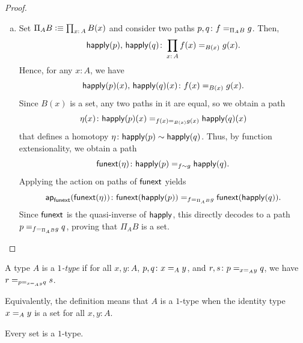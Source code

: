\begin{proof}
\begin{enumerate}[a),font=\upshape]
        \item Set $\Pi_AB\defeq\prod_{x\colon A}B(x)$ and consider two paths $p,q\colon f\eq{\Pi_AB}g$. Then,
        \[
            \fun{happly}(p),\,\fun{happly}(q)
                \colon\prod_{x\colon A}f(x)\eq{B(x)}g(x).
        \]
        Hence, for any $x\colon A$, we have
        \[
            \fun{happly}(p)(x),\,\fun{happly}(q)(x)\colon f(x)\eq{B(x)}g(x).
        \]
        Since $B(x)$ is a set, any two paths in it are equal, so we obtain a path
        \[
            \eta(x)\colon\fun{happly}(p)(x)
                \eq{f(x)\eq{B(x)}g(x)}\fun{happly}(q)(x)
        \]
        that defines a homotopy $\eta\colon\fun{happly}(p)\sim\fun{happly}(q)$. Thus, by function extensionality, we obtain a path
        \[
            \fun{funext}(\eta)\colon\fun{happly}(p)\eq{f\sim g}\fun{happly}(q).
        \]
        Applying the action on paths of $\mathsf{funext}$ yields
        \[
            \fun{ap}_{\fun{funext}}(\fun{funext}(\eta))\colon
                \fun{funext}(\fun{happly}(p))
                \eq{f\eq{\Pi_AB}g}
                \fun{funext}(\fun{happly}(q)).
        \]
        Since $\mathsf{funext}$ is the quasi-inverse of $\mathsf{happly}$, this directly decodes to a path $p\mathrel{=_{f\mathrel{=_{\Pi_AB}}g}}q$, proving that $\Pi_AB$ is a set.
    \end{enumerate}
\end{proof}

\begin{defn}\label{defn:1-type}
    A type $A$ is a \textsl{$1$-type} if for all $x,y\colon A$, $p,q\colon x\eq Ay$, and $r,s\colon p\eq{x\eq Ay}q$, we have $r\mathrel{=_{p\mathrel{=_{x\mathrel{=_{A}}y}}q}}s$.
\end{defn}

\begin{rem}
    Equivalently, the definition means that $A$ is a $1$-type when the identity type $x\mathrel{=_{A}}y$ is a set for all $x,y\colon A$.
\end{rem}

\begin{lem}\label{lem:set-implies-id-types-are-sets}
    Every set is a\/ $1$-type.
\end{lem}

